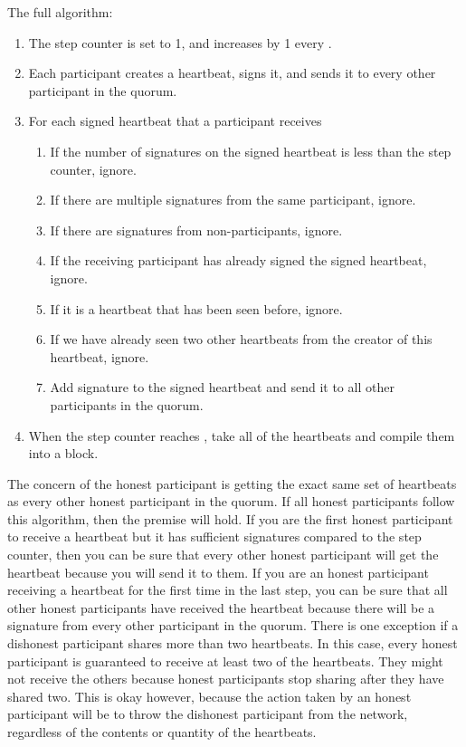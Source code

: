 \documentclass[twocolumn]{article}
\begin{document}
The full algorithm:
\begin{enumerate}
	\item The step counter is set to 1, and increases by 1 every \stepduration{}.
	\item Each participant creates a heartbeat, signs it, and sends it to every other participant in the quorum.
	\item For each signed heartbeat that a participant receives
	\begin{enumerate}
		\item If the number of signatures on the signed heartbeat is less than the step counter, ignore.
		\item If there are multiple signatures from the same participant, ignore.
		\item If there are signatures from non-participants, ignore.
		\item If the receiving participant has already signed the signed heartbeat, ignore.
		\item If it is a heartbeat that has been seen before, ignore.
		\item If we have already seen two other heartbeats from the creator of this heartbeat, ignore.
		\item Add signature to the signed heartbeat and send it to all other participants in the quorum.
	\end{enumerate}
	\item When the step counter reaches \quorumsize{}, take all of the heartbeats and compile them into a block.
\end{enumerate}

The concern of the honest participant is getting the exact same set of heartbeats as every other honest participant in the quorum.
If all honest participants follow this algorithm, then the premise will hold.
If you are the first honest participant to receive a heartbeat but it has sufficient signatures compared to the step counter, then you can be sure that every other honest participant will get the heartbeat because you will send it to them.
If you are an honest participant receiving a heartbeat for the first time in the last step, you can be sure that all other honest participants have received the heartbeat because there will be a signature from every other participant in the quorum.
There is one exception if a dishonest participant shares more than two heartbeats.
In this case, every honest participant is guaranteed to receive at least two of the heartbeats.
They might not receive the others because honest participants stop sharing after they have shared two.
This is okay however, because the action taken by an honest participant will be to throw the dishonest participant from the network, regardless of the contents or quantity of the heartbeats.
\end{document}
